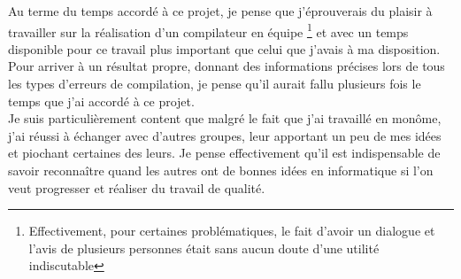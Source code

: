 \documentclass[12pt]{article}
\begin{document}
Au terme du temps accordé à ce projet, je pense que j'éprouverais du plaisir
à travailler sur la réalisation d'un compilateur en équipe
\footnote{Effectivement, pour certaines problématiques, le fait d'avoir un
dialogue et l'avis de plusieurs personnes était sans aucun doute d'une
utilité indiscutable} et avec un temps disponible pour ce travail plus
important que celui que j'avais à ma disposition. Pour arriver à un résultat
propre, donnant des informations précises lors de tous les types d'erreurs
de compilation, je pense qu'il aurait fallu plusieurs fois le temps que j'ai
accordé à ce projet.\\

Je suis particulièrement content que malgré le fait que j'ai travaillé en
monôme, j'ai réussi à échanger avec d'autres groupes, leur apportant un peu
de mes idées et piochant certaines des leurs. Je pense effectivement qu'il
est indispensable de savoir reconnaître quand les autres ont de bonnes idées
en informatique si l'on veut progresser et réaliser du travail de qualité.
\end{document}
